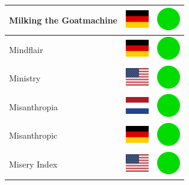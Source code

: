 \documentclass[12pt, a4paper, twoside]{report}
\begin{document}
\begin{center}
\begin{longtable}{|p{5cm}|p{2cm}|p{2cm}|}
Milking the Goatmachine & \includegraphics[width=1cm]{4x3/de} & \includegraphics[width=1cm]{likes/y} \\ \hline
Mindflair & \includegraphics[width=1cm]{4x3/de} & \includegraphics[width=1cm]{likes/y} \\ \hline
Ministry & \includegraphics[width=1cm]{4x3/us} & \includegraphics[width=1cm]{likes/y} \\ \hline
Misanthropia & \includegraphics[width=1cm]{4x3/nl} & \includegraphics[width=1cm]{likes/y} \\ \hline
Misanthropic & \includegraphics[width=1cm]{4x3/de} & \includegraphics[width=1cm]{likes/y} \\ \hline
Misery Index & \includegraphics[width=1cm]{4x3/us} & \includegraphics[width=1cm]{likes/y} \\ \hline

\end{longtable}
\end{center}
\end{document}
